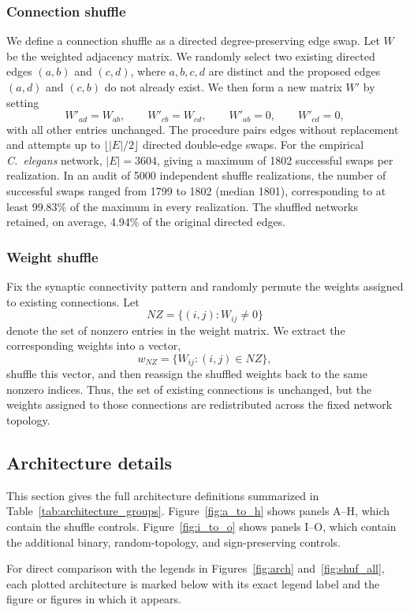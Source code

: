 \documentclass[a4paper,fleqn]{style_neural_networks/cas-dc}
\begin{document}
\subsubsection{Connection shuffle}
\label{supp:Connection-Shuffle}
We define a connection shuffle as a directed degree-preserving edge swap. Let \(W\) be the weighted adjacency matrix. We randomly select two existing directed edges \((a,b)\) and \((c,d)\), where \(a,b,c,d\) are distinct and the proposed edges \((a,d)\) and \((c,b)\) do not already exist. We then form a new matrix \(W'\) by setting
\[
W'_{ad}=W_{ab}, \qquad
W'_{cb}=W_{cd}, \qquad
W'_{ab}=0, \qquad
W'_{cd}=0,
\]
with all other entries unchanged. The procedure pairs edges without replacement and attempts up to \(\lfloor |E|/2\rfloor\) directed double-edge swaps. For the empirical \textit{C.\ elegans} network, \(|E|=3604\), giving a maximum of 1802 successful swaps per realization. In an audit of 5000 independent shuffle realizations, the number of successful swaps ranged from 1799 to 1802 (median 1801), corresponding to at least 99.83\% of the maximum in every realization. The shuffled networks retained, on average, 4.94\% of the original directed edges.

\subsubsection{Weight shuffle}

\label{supp:Weight-Shuffle}
Fix the synaptic connectivity pattern and randomly permute the weights assigned to existing connections. Let
\[
NZ=\{(i,j): W_{ij}\neq 0\}
\]
denote the set of nonzero entries in the weight matrix. We extract the corresponding weights into a vector,
\[
w_{NZ}=\{W_{ij}:(i,j)\in NZ\},
\]
shuffle this vector, and then reassign the shuffled weights back to the same nonzero indices. Thus, the set of existing connections is unchanged, but the weights assigned to those connections are redistributed across the fixed network topology.
\subsection{Architecture details}
\label{supp:architectures}
This section gives the full architecture definitions summarized in Table~\ref{tab:architecture_groups}. Figure~\ref{fig:a_to_h} shows panels A--H, which contain the shuffle controls. Figure~\ref{fig:i_to_o} shows panels I--O, which contain the additional binary, random-topology, and sign-preserving controls.

For direct comparison with the legends in Figures~\ref{fig:arch} and~\ref{fig:shuf_all}, each plotted architecture is marked below with its exact legend label and the figure or figures in which it appears. 
\end{document}

